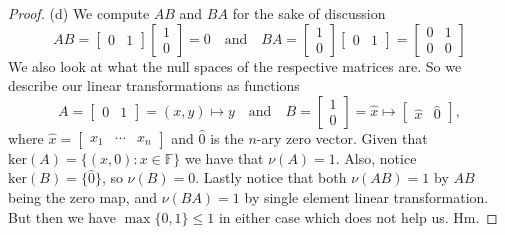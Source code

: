 \documentclass[12pt]{amsart}
\begin{document}
\begin{onehalfspace}
\begin{proof}
            (d) We compute $AB$ and $BA$ for the sake of discussion
            \begin{displaymath}
                AB = \left[\begin{matrix}
                               0 & 1
                \end{matrix}\right]
                \left[\begin{matrix}
                          1 \\ 0
                \end{matrix}\right] = 0
                \quad\text{and}\quad
                BA = \left[\begin{matrix}
                               1 \\ 0
                \end{matrix}\right]
                \left[\begin{matrix}
                          0 & 1
                \end{matrix}\right] =
                \left[\begin{matrix}
                          0 & 1\\
                          0 & 0
                \end{matrix}\right]
            \end{displaymath}
            We also look at what the null spaces of the respective matrices are.
            So we describe our linear transformations as functions
            \begin{displaymath}
                A = \left[\begin{matrix}
                              0 & 1
                \end{matrix}\right]
                = (x,y)\longmapsto y
                \quad\text{and}\quad
                B = \left[\begin{matrix}
                              1 \\ 0
                \end{matrix}\right] =
                \hat{x}\longmapsto
                \left[\begin{matrix}
                          \hat{x} & \hat{0}
                \end{matrix}\right],
            \end{displaymath}
            where $\hat{x} = [\begin{matrix}x_1 & \cdots & x_n\end{matrix}]$ and $\hat{0}$ is the $n$-ary
            zero vector.
            Given that $\text{ker}(A) = \{(x,0): x\in\mathbb{F}\}$ we have that $\nu(A)=1$.
            Also, notice $\text{ker}(B) = \{\hat{0}\}$, so $\nu(B)=0$.
            Lastly notice that both $\nu(AB)=1$ by $AB$ being the zero map, and $\nu(BA)=1$ by
            single element linear transformation.
            But then we have $\max\{0,1\}\le 1$ in either case which does not help us. Hm.


\end{proof}
\end{onehalfspace}
\end{document}
